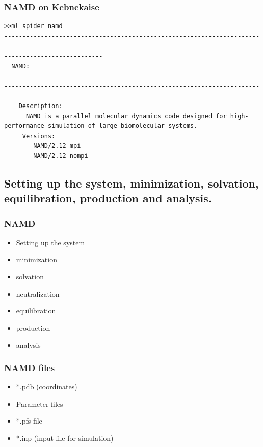 \documentclass{beamer}
\begin{document}
\begin{frame}[fragile]
\frametitle{NAMD on Kebnekaise}


\begin{verbatim} 
>>ml spider namd
-----------------------------------------------------------------------------------------------------------------------------------------------------------------------
  NAMD:
-----------------------------------------------------------------------------------------------------------------------------------------------------------------------
    Description:
      NAMD is a parallel molecular dynamics code designed for high-performance simulation of large biomolecular systems. 
     Versions:
        NAMD/2.12-mpi
        NAMD/2.12-nompi
\end{verbatim} 

\end{frame}

\subsection{Setting up the system, minimization, solvation, equilibration, production and analysis.}


\begin{frame}
\frametitle{NAMD}

\begin{itemize}
\item Setting up the system
\item minimization
\item solvation
\item neutralization
\item equilibration
\item production 
\item analysis
\end{itemize}

\end{frame}

\begin{frame}
\frametitle{NAMD files}
\begin{itemize}
	\item *.pdb (coordinates)
	\item Parameter files 
	\item *.pfs file
	\item *.inp (input file for simulation)
\end{itemize}
\end{frame}
\end{document}
